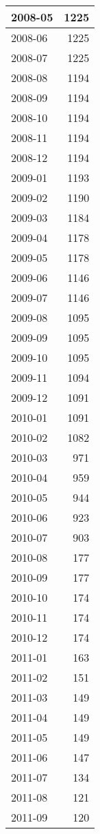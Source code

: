\documentclass[
]{article}
\begin{document}
\begin{table}[H]
\begin{tabular}{l|r}
\hline
2008-05 & 1225\\
\hline
2008-06 & 1225\\
\hline
2008-07 & 1225\\
\hline
2008-08 & 1194\\
\hline
2008-09 & 1194\\
\hline
2008-10 & 1194\\
\hline
2008-11 & 1194\\
\hline
2008-12 & 1194\\
\hline
2009-01 & 1193\\
\hline
2009-02 & 1190\\
\hline
2009-03 & 1184\\
\hline
2009-04 & 1178\\
\hline
2009-05 & 1178\\
\hline
2009-06 & 1146\\
\hline
2009-07 & 1146\\
\hline
2009-08 & 1095\\
\hline
2009-09 & 1095\\
\hline
2009-10 & 1095\\
\hline
2009-11 & 1094\\
\hline
2009-12 & 1091\\
\hline
2010-01 & 1091\\
\hline
2010-02 & 1082\\
\hline
2010-03 & 971\\
\hline
2010-04 & 959\\
\hline
2010-05 & 944\\
\hline
2010-06 & 923\\
\hline
2010-07 & 903\\
\hline
2010-08 & 177\\
\hline
2010-09 & 177\\
\hline
2010-10 & 174\\
\hline
2010-11 & 174\\
\hline
2010-12 & 174\\
\hline
2011-01 & 163\\
\hline
2011-02 & 151\\
\hline
2011-03 & 149\\
\hline
2011-04 & 149\\
\hline
2011-05 & 149\\
\hline
2011-06 & 147\\
\hline
2011-07 & 134\\
\hline
2011-08 & 121\\
\hline
2011-09 & 120\\

\end{tabular}
\end{table}
\end{document}
